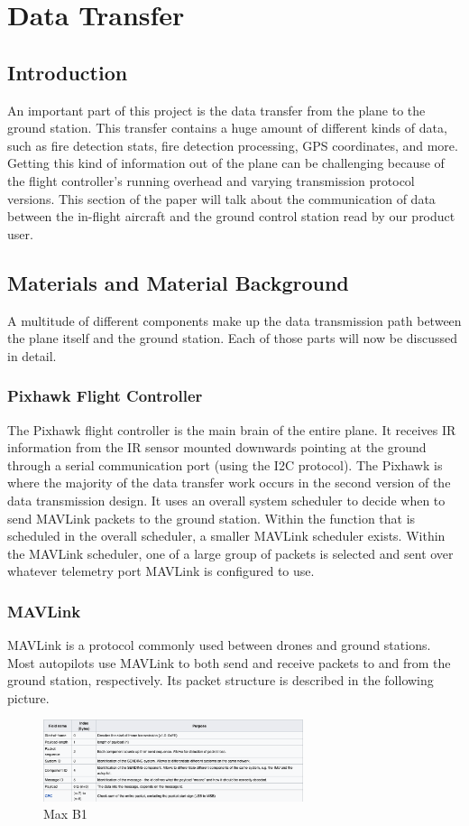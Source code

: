 \documentclass[12pt,journal,compsoc]{IEEEtran}
\begin{document}
\section{Data Transfer}
\subsection{Introduction}
An important part of this project is the data transfer from the plane to the ground station. This transfer contains a huge amount of different kinds of data, such as fire detection stats, fire detection processing, GPS coordinates, and more. Getting this kind of information out of the plane can be challenging because of the flight controller's running overhead and varying transmission protocol versions. This section of the paper will talk about the communication of data between the in-flight aircraft and the ground control station read by our product user.

\subsection{Materials and Material Background}
A multitude of different components make up the data transmission path between the plane itself and the ground station. Each of those parts will now be discussed in detail.
\subsubsection{Pixhawk Flight Controller}
The Pixhawk flight controller is the main brain of the entire plane. It receives IR information from the IR sensor mounted downwards pointing at the ground through a serial communication port (using the I2C protocol). The Pixhawk is where the majority of the data transfer work occurs in the second version of the data transmission design. It uses an overall system scheduler to decide when to send MAVLink packets to the ground station. Within the function that is scheduled in the overall scheduler, a smaller MAVLink scheduler exists. Within the MAVLink scheduler, one of a large group of packets is selected and sent over whatever telemetry port MAVLink is configured to use.
\subsubsection{MAVLink}
MAVLink is a protocol commonly used between drones and ground stations. Most autopilots use MAVLink to both send and receive packets to and from the ground station, respectively. Its packet structure is described in the following picture.
\begin{figure}[h!]
\hspace*{0cm}
\centering
\includegraphics[width=3in]{MavlinkStructure.png}
\caption{Max B1}
\label{mavStruct}
\end{figure}
\end{document}
